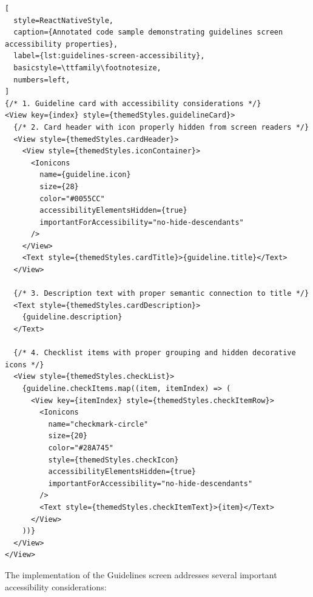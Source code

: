 \begin{lstlisting}[
  style=ReactNativeStyle,
  caption={Annotated code sample demonstrating guidelines screen accessibility properties},
  label={lst:guidelines-screen-accessibility},
  basicstyle=\ttfamily\footnotesize,
  numbers=left,
]
{/* 1. Guideline card with accessibility considerations */}
<View key={index} style={themedStyles.guidelineCard}>
  {/* 2. Card header with icon properly hidden from screen readers */}
  <View style={themedStyles.cardHeader}>
    <View style={themedStyles.iconContainer}>
      <Ionicons
        name={guideline.icon}
        size={28}
        color="#0055CC"
        accessibilityElementsHidden={true}
        importantForAccessibility="no-hide-descendants"
      />
    </View>
    <Text style={themedStyles.cardTitle}>{guideline.title}</Text>
  </View>

  {/* 3. Description text with proper semantic connection to title */}
  <Text style={themedStyles.cardDescription}>
    {guideline.description}
  </Text>

  {/* 4. Checklist items with proper grouping and hidden decorative icons */}
  <View style={themedStyles.checkList}>
    {guideline.checkItems.map((item, itemIndex) => (
      <View key={itemIndex} style={themedStyles.checkItemRow}>
        <Ionicons
          name="checkmark-circle"
          size={20}
          color="#28A745"
          style={themedStyles.checkIcon}
          accessibilityElementsHidden={true}
          importantForAccessibility="no-hide-descendants"
        />
        <Text style={themedStyles.checkItemText}>{item}</Text>
      </View>
    ))}
  </View>
</View>
\end{lstlisting}

\FloatBarrier

The implementation of the Guidelines screen addresses several important accessibility considerations:

